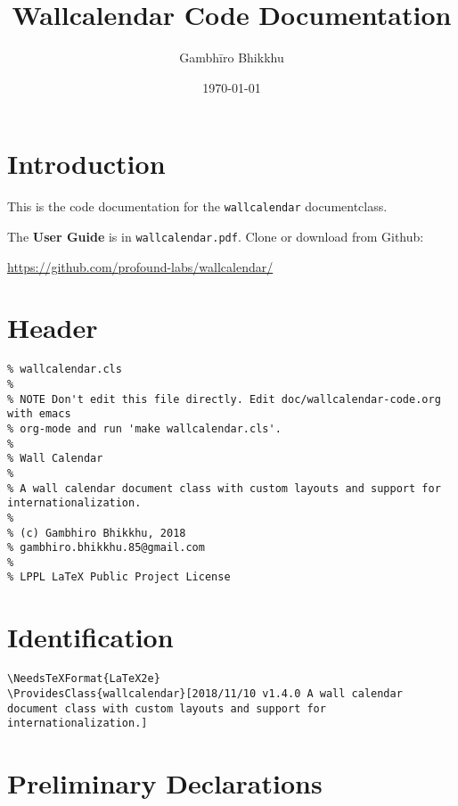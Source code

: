 \documentclass[11pt,oneside]{memoir-article}
\author{Gambhīro Bhikkhu}
\date{\today}
\title{Wallcalendar Code Documentation}
\begin{document}
\maketitle

\chapter{Introduction}
\label{sec:org4933eec}

\bigskip

This is the code documentation for the \texttt{wallcalendar} documentclass.

The \textbf{User Guide} is in \texttt{wallcalendar.pdf}. Clone or download from Github:

\href{https://github.com/profound-labs/wallcalendar/}{https://github.com/profound-labs/wallcalendar/}

\bigskip

\tableofcontents*

\clearpage

\chapter{Header}
\label{sec:org0a40dcd}

\begin{verbatim}
% wallcalendar.cls
%
% NOTE Don't edit this file directly. Edit doc/wallcalendar-code.org with emacs
% org-mode and run 'make wallcalendar.cls'.
%
% Wall Calendar
%
% A wall calendar document class with custom layouts and support for internationalization.
%
% (c) Gambhiro Bhikkhu, 2018
% gambhiro.bhikkhu.85@gmail.com
%
% LPPL LaTeX Public Project License
\end{verbatim}

\chapter{Identification}
\label{sec:orgf19a199}

\begin{verbatim}
\NeedsTeXFormat{LaTeX2e}
\ProvidesClass{wallcalendar}[2018/11/10 v1.4.0 A wall calendar document class with custom layouts and support for internationalization.]
\end{verbatim}

\chapter{Preliminary Declarations}
\label{sec:orgd09dd24}
\end{document}

